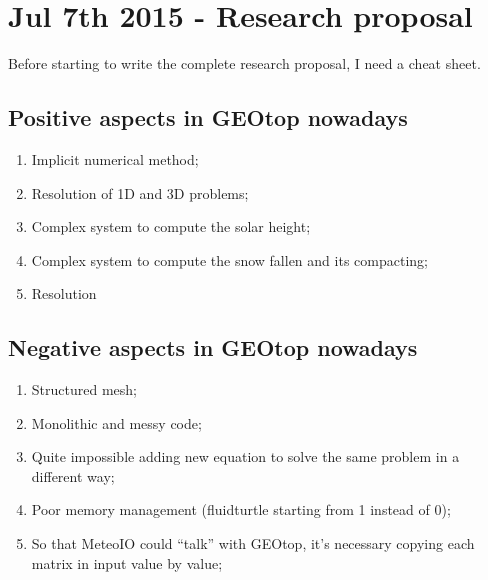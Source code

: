 \section{Jul 7th 2015 - Research proposal}\label{sec:20150704}

Before starting to write the complete research proposal, I need a cheat sheet.

\subsection{Positive aspects in GEOtop nowadays}

\begin{enumerate}
\item Implicit numerical method;
\item Resolution of 1D and 3D problems;
\item Complex system to compute the solar height;
\item Complex system to compute the snow fallen and its compacting;
\item Resolution
\end{enumerate}

\subsection{Negative aspects in GEOtop nowadays}

\begin{enumerate}
\item Structured mesh;
\item Monolithic and messy code;
\item Quite impossible adding new equation to solve the same problem in a different way;
\item Poor memory management (fluidturtle starting from 1 instead of 0);
\item So that MeteoIO could ``talk'' with GEOtop, it's necessary copying each matrix in input value by value;
\end{enumerate}
